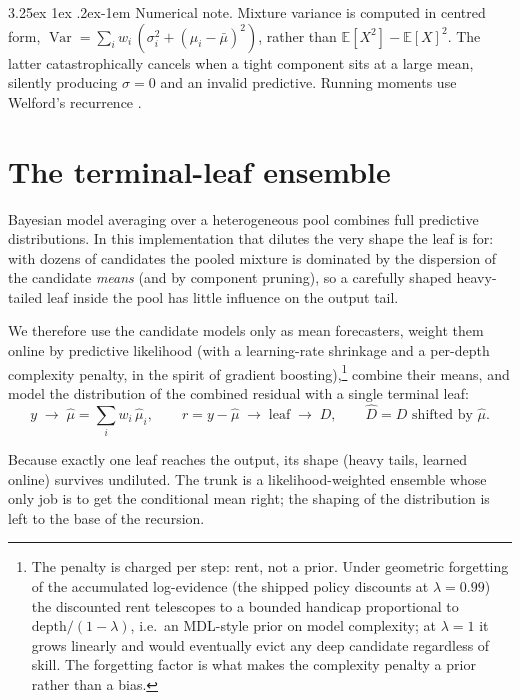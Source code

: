 \documentclass[article]{jss}
\makeatletter
\renewcommand\paragraph{\@startsection{paragraph}{4}{\z@}%
  {3.25ex \@plus1ex \@minus.2ex}{-1em}%
  {\normalfont\normalsize\itshape}}
\makeatother
\begin{document}
\paragraph{Numerical note.}
Mixture variance is computed in centred form,
$\operatorname{Var} = \sum_i w_i\,(\sigma_i^2 + (\mu_i-\bar\mu)^2)$, rather than
$\mathbb E[X^2]-\mathbb E[X]^2$. The latter catastrophically cancels when a tight
component sits at a large mean, silently producing $\sigma=0$ and an invalid
predictive. Running moments use Welford's recurrence \citep{welford1962note}.

\section{The terminal-leaf ensemble} \label{sec:trunk}

Bayesian model averaging over a heterogeneous pool
\citep{hoeting1999bayesian,raftery2005using} combines full predictive
distributions. In this implementation that dilutes the very shape the leaf is
for: with dozens of candidates the pooled mixture is dominated by the dispersion
of the candidate \emph{means} (and by component pruning), so a carefully shaped
heavy-tailed leaf inside the pool has little influence on the output tail.

We therefore use the candidate models
only as mean forecasters, weight them online by predictive likelihood
(with a learning-rate shrinkage and a per-depth complexity penalty, in the
spirit of gradient boosting),\footnote{The penalty is charged per step:
rent, not a prior. Under geometric forgetting of the accumulated log-evidence
(the shipped policy discounts at $\lambda=0.99$) the discounted rent
telescopes to a bounded handicap proportional to $\text{depth}/(1-\lambda)$,
i.e.\ an MDL-style prior on model complexity; at $\lambda=1$ it grows linearly
and would eventually evict any deep candidate regardless of skill. The
forgetting factor is what makes the complexity penalty a prior rather than a
bias.} combine their means, and model the distribution of
the combined residual with a single terminal leaf:
\[
 y \;\to\; \hat\mu = \sum_i w_i\,\hat\mu_i, \qquad
 r = y-\hat\mu \;\to\; \text{leaf} \;\to\; D, \qquad
 \hat D = D \text{ shifted by } \hat\mu .
\]

Because exactly one leaf reaches the output, its shape (heavy tails, learned
online) survives undiluted. The trunk is a likelihood-weighted ensemble whose
only job is to get the conditional mean right; the shaping of the distribution is
left to the base of the recursion.
\end{document}
